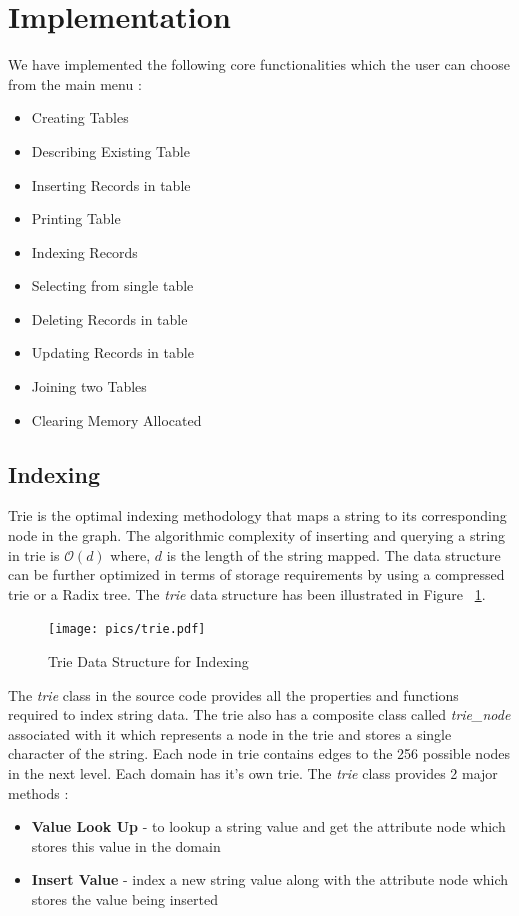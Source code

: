 \documentclass[12pt, oneside]{book}
\begin{document}
\section{Implementation}
We have implemented the following core functionalities which the user can choose from the main menu :
\begin{multicols}{2}
 \begin{itemize}
  \item Creating Tables
  \item Describing Existing Table
  \item Inserting Records in table
  \item Printing Table
  \item Indexing Records
  \item Selecting from single table
  \item Deleting Records in table
  \item Updating Records in table
  \item Joining two Tables
  \item Clearing Memory Allocated
 \end{itemize}
\end{multicols}

\subsection{Indexing}
Trie is the optimal indexing methodology that maps a string to its corresponding node in the graph. The algorithmic complexity of inserting and querying a string in trie is $\mathcal{O} \left( d\right)$ where, $d$ is the length of the string mapped. The data structure can be further optimized in terms of storage requirements by using a compressed trie or a Radix tree. The \emph{trie} data structure has been illustrated in Figure ~\ref{fig:trie}.
\begin{figure}
 \centering
 \texttt{[image: pics/trie.pdf]}
 \caption{Trie Data Structure for Indexing}
 \label{fig:trie}
\end{figure}

The \emph{trie} class in the source code provides all the properties and functions required to index string data. The trie also has a composite class called \emph{trie\_node} associated with it which represents a node in the trie and stores a single character of the string. Each node in trie contains edges to the 256 possible nodes in the next level. Each domain has it's own trie. The \emph{trie} class provides 2 major methods :
\begin{itemize}
 \item \textbf{Value Look Up} - to lookup a string value and get the attribute node which stores this value in the domain
 \item \textbf{Insert Value} - index a new string value along with the attribute node which stores the value being inserted
\end{itemize}
\end{document}
